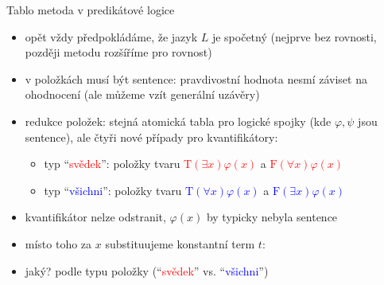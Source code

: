 \documentclass{beamer}
\begin{document}
\begin{frame}{Tablo metoda v predikátové logice}

    \begin{itemize}
        \item opět vždy předpokládáme, že jazyk $L$ je spočetný
        (nejprve bez rovnosti, později metodu rozšíříme pro rovnost)
        \item v položkách musí být \alert{sentence}: pravdivostní hodnota nesmí záviset na ohodnocení (ale můžeme vzít \alert{generální uzávěry})
        \item \alert{redukce položek}: stejná atomická tabla pro logické spojky (kde $\varphi,\psi$ jsou sentence), ale čtyři nové případy \alert{pro kvantifikátory}:
        \begin{itemize}
            \item typ ``\textcolor{red}{svědek}'': položky tvaru \textcolor{red}{$\mathrm{T}(\exists x)\varphi(x)$} a \textcolor{red}{$\mathrm{F}(\forall x)\varphi(x)$}
            \item typ ``\textcolor{blue}{všichni}'': položky tvaru \textcolor{blue}{$\mathrm{T}(\forall x)\varphi(x)$} a \textcolor{blue}{$\mathrm{F}(\exists x)\varphi(x)$}    
        \end{itemize}
        \item kvantifikátor nelze odstranit, $\varphi(x)$ by typicky nebyla sentence
        \item místo toho za $x$ \alert{substituujeme} \alert{konstantní term} $t$: 
        \item jaký? podle typu položky (``\textcolor{red}{svědek}'' vs. ``\textcolor{blue}{všichni}'')
       
    \end{itemize}        

\end{frame}
\end{document}
